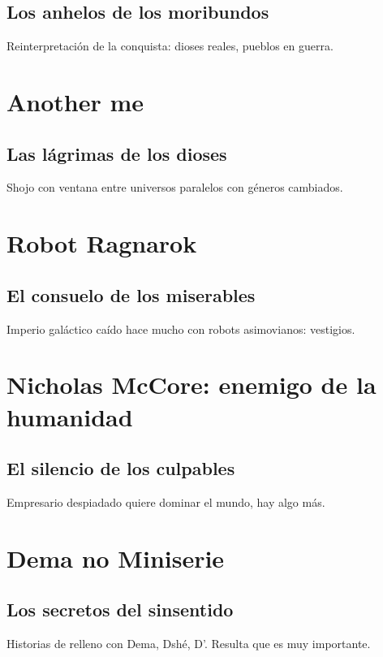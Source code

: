 \documentclass[letterpaper,12pt]{article}
\begin{document}
	\subsection*{Los anhelos de los moribundos}
	
	Reinterpretación de la conquista: dioses reales, pueblos en guerra.
	
	\newpage
	
	\section*{Another me}
	
	\subsection*{Las lágrimas de los dioses}
	
	Shojo con ventana entre universos paralelos con géneros cambiados.
	
	\newpage
	
	\section*{Robot Ragnarok}
	
	\subsection*{El consuelo de los miserables}	
	
	Imperio galáctico caído hace mucho con robots asimovianos: vestigios.
	
	\newpage
	
	\section*{Nicholas McCore: enemigo de la humanidad}
	
	\subsection*{El silencio de los culpables}
	
	Empresario despiadado quiere dominar el mundo, hay algo más.
	
	\newpage
	
	\section*{Dema no Miniserie}
	
	\subsection*{Los secretos del sinsentido}
	
	Historias de relleno con Dema, Dshé, D'. Resulta que es muy importante.
	
\end{document}
